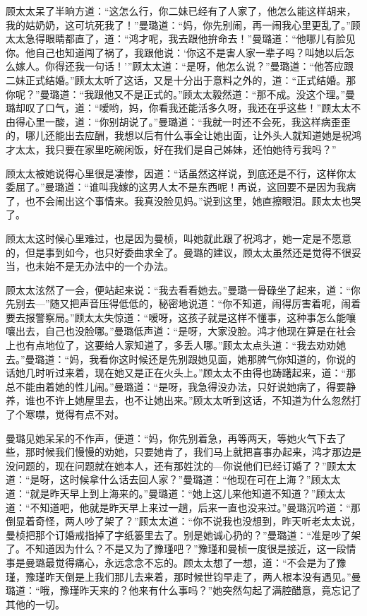 \par 顾太太呆了半晌方道：“这怎么行，你二妹已经有了人家了，他怎么能这样胡来，我的姑奶奶，这可坑死我了！”曼璐道：“妈，你先别闹，再一闹我心里更乱了。”顾太太急得眼睛都直了，道：“鸿才呢，我去跟他拚命去！”曼璐道：“他哪儿有脸见你。他自己也知道闯了祸了，我跟他说：‘你这不是害人家一辈子吗？叫她以后怎么嫁人。你得还我一句话！’”顾太太道：“是呀，他怎么说？”曼璐道：“他答应跟二妹正式结婚。”顾太太听了这话，又是十分出于意料之外的，道：“正式结婚。那你呢？”曼璐道：“我跟他又不是正式的。”顾太太毅然道：“那不成。没这个理。”曼璐却叹了口气，道：“嗳哟，妈，你看我还能活多久呀，我还在乎这些！”顾太太不由得心里一酸，道：“你别胡说了。”曼璐道：“我就一时还不会死，我这样病歪歪的，哪儿还能出去应酬，我想以后有什么事全让她出面，让外头人就知道她是祝鸿才太太，我只要在家里吃碗闲饭，好在我们是自己姊妹，还怕她待亏我吗？”
\par 顾太太被她说得心里很是凄惨，因道：“话虽然这样说，到底还是不行，这样你太委屈了。”曼璐道：“谁叫我嫁的这男人太不是东西呢！再说，这回要不是因为我病了，也不会闹出这个事情来。我真没脸见妈。”说到这里，她直擦眼泪。顾太太也哭了。
\par 顾太太这时候心里难过，也是因为曼桢，叫她就此跟了祝鸿才，她一定是不愿意的，但是事到如今，也只好委曲求全了。曼璐的建议，顾太太虽然还是觉得不很妥当，也未始不是无办法中的一个办法。
\par 顾太太泫然了一会，便站起来说：“我去看看她去。”曼璐一骨碌坐了起来，道：“你先别去—”随又把声音压得低低的，秘密地说道：“你不知道，闹得厉害着呢，闹着要去报警察局。”顾太太失惊道：“嗳呀，这孩子就是这样不懂事，这种事怎么能嚷嚷出去，自己也没脸哪。”曼璐低声道：“是呀，大家没脸。鸿才他现在算是在社会上也有点地位了，这要给人家知道了，多丢人哪。”顾太太点头道：“我去劝劝她去。”曼璐道：“妈，我看你这时候还是先别跟她见面，她那脾气你知道的，你说的话她几时听过来着，现在她又是正在火头上。”顾太太不由得也踌躇起来，道：“那总不能由着她的性儿闹。”曼璐道：“是呀，我急得没办法，只好说她病了，得要静养，谁也不许上她屋里去，也不让她出来。”顾太太听到这话，不知道为什么忽然打了个寒噤，觉得有点不对。
\par 曼璐见她呆呆的不作声，便道：“妈，你先别着急，再等两天，等她火气下去了些，那时候我们慢慢的劝她，只要她肯了，我们马上就把喜事办起来，鸿才那边是没问题的，现在问题就在她本人，还有那姓沈的—你说他们已经订婚了？”顾太太道：“是呀，这时候拿什么话去回人家？”曼璐道：“他现在可在上海？”顾太太道：“就是昨天早上到上海来的。”曼璐道：“她上这儿来他知道不知道？”顾太太道：“不知道吧，他就是昨天早上来过一趟，后来一直也没来过。”曼璐沉吟道：“那倒显着奇怪，两人吵了架了？”顾太太道：“你不说我也没想到，昨天听老太太说，曼桢把那个订婚戒指掉了字纸篓里去了。别是她诚心扔的？”曼璐道：“准是吵了架了。不知道因为什么？不是又为了豫瑾吧？”豫瑾和曼桢一度很是接近，这一段情事是曼璐最觉得痛心，永远念念不忘的。顾太太想了一想，道：“不会是为了豫瑾，豫瑾昨天倒是上我们那儿去来着，那时候世钧早走了，两人根本没有遇见。”曼璐道：“哦，豫瑾昨天来的？他来有什么事吗？”她突然勾起了满腔醋意，竟忘记了其他的一切。
